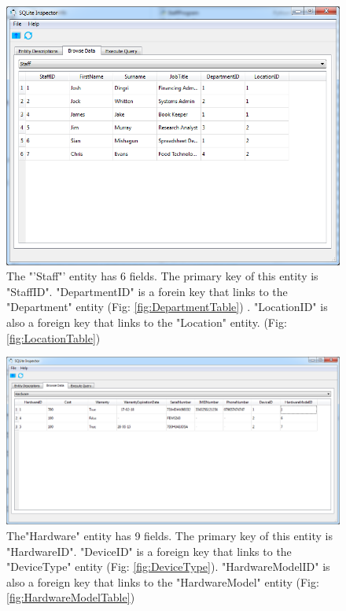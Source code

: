 \begin{figure}[H]
    \includegraphics[width=\textwidth]{./Maintenance/Images/StaffTable.png}
    \caption{The "'Staff"' entity has 6 fields. The primary key of this entity is "StaffID". "DepartmentID" is a forein key that links to the "Department" entity (Fig: \ref{fig:DepartmentTable}) . "LocationID" is also a foreign key that links to the "Location" entity. (Fig: \ref{fig:LocationTable})} \label{fig:StaffTable}
\end{figure}

\begin{figure}[H]
    \includegraphics[width=\textwidth]{./Maintenance/Images/HardwareTable.png}
    \caption{The"Hardware" entity has 9 fields. The primary key of this entity is "HardwareID". "DeviceID" is a foreign key that links to the "DeviceType" entity  (Fig: \ref{fig:DeviceType}). "HardwareModelID" is also a foreign key that links to the "HardwareModel" entity (Fig: \ref{fig:HardwareModelTable})} \label{fig:HardwareTable}
\end{figure}

